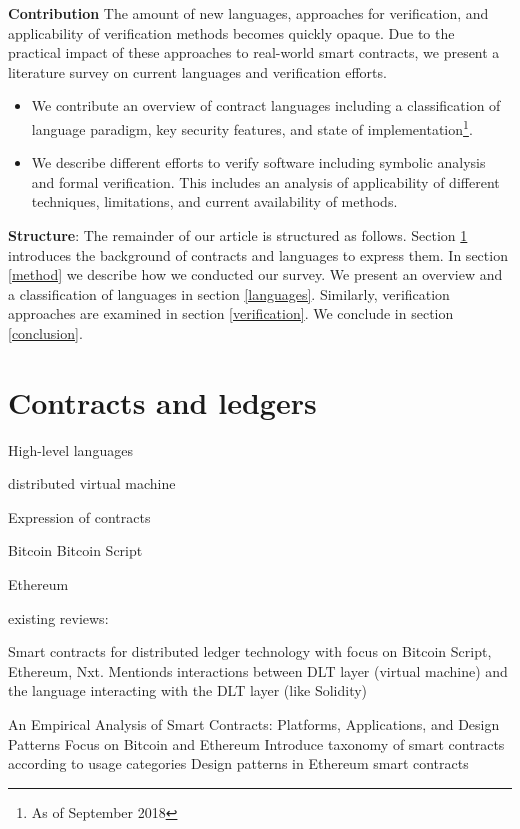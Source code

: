 \documentclass{article}
\begin{document}
\textbf{Contribution} The amount of new languages, approaches for verification, and applicability of verification methods becomes quickly opaque. Due to the practical impact of these approaches to real-world smart contracts, we present a literature survey on current languages and verification efforts.
\begin{itemize}
\item We contribute an overview of contract languages including a classification of language paradigm, key security features, and state of implementation\footnote{As of September 2018}.
\item We describe different efforts to verify software including symbolic analysis and formal verification. This includes an analysis of applicability of different techniques, limitations, and current availability of methods.
\end{itemize}

\textbf{Structure}: The remainder of our article is structured as follows. Section \ref{background} introduces the background of contracts and languages to express them. In section \ref{method} we describe how we conducted our survey. We present an overview and a classification of languages in section \ref{languages}. Similarly, verification approaches are examined in section \ref{verification}. We conclude in section \ref{conclusion}.


\section{Contracts and ledgers}
\label{background}

High-level languages

distributed virtual machine

Expression of contracts

Bitcoin \cite{Nakamoto2008}
Bitcoin Script \cite{BitcoinWiki2018Script}

Ethereum \cite{Buterin2013,Wood2014}

existing reviews:

Smart contracts for distributed ledger technology with focus on Bitcoin Script, Ethereum, Nxt. Mentionds interactions between DLT layer (virtual machine) and the language interacting with the DLT layer (like Solidity)
\cite{Seijas2017}


An Empirical Analysis of Smart Contracts: Platforms, Applications, and Design Patterns
Focus on Bitcoin and Ethereum
Introduce taxonomy of smart contracts according to usage categories
Design patterns in Ethereum smart contracts
\cite{Bartoletti2017}
\end{document}
